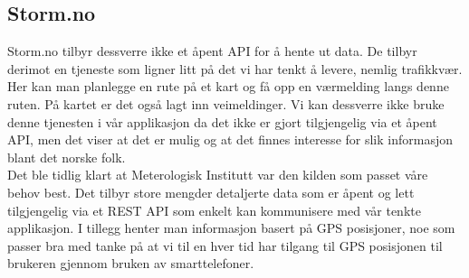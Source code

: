 \documentclass[a4paper,norsk,oneside]{book}
\begin{document}
\subsection{Storm.no}
Storm.no tilbyr dessverre ikke et åpent API for å hente ut data. De tilbyr derimot en tjeneste som ligner litt på det vi har tenkt å levere, nemlig trafikkvær. Her kan man planlegge en rute på et kart og få opp en værmelding langs denne ruten. På kartet er det også lagt inn veimeldinger. Vi kan dessverre ikke bruke denne tjenesten i vår applikasjon da det ikke er gjort tilgjengelig via et åpent API, men det viser at det er mulig og at det finnes interesse for slik informasjon blant det norske folk.\\
\newline
Det ble tidlig klart at Meterologisk Institutt var den kilden som passet våre behov best. Det tilbyr store mengder detaljerte data som er åpent og lett tilgjengelig via et REST API som enkelt kan kommunisere med vår tenkte applikasjon. I tillegg henter man informasjon basert på GPS posisjoner, noe som passer bra med tanke på at vi til en hver tid har tilgang til GPS posisjonen til brukeren gjennom bruken av smarttelefoner.\cite{storm}
\end{document}
